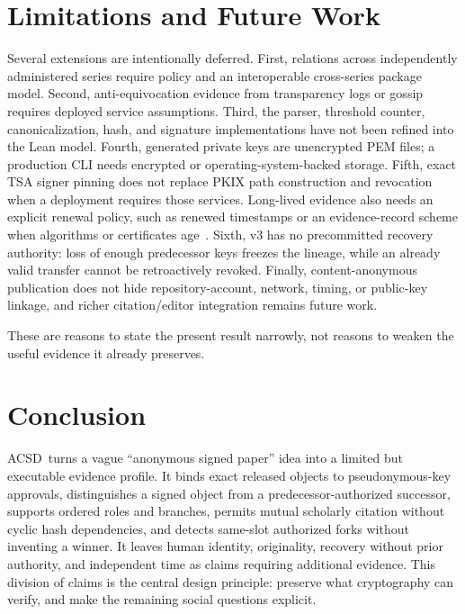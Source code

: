 \documentclass[11pt]{article}
\newcommand{\acsd}{\textsc{ACSD}}
\begin{document}
\section{Limitations and Future Work}

Several extensions are intentionally deferred. First, relations across independently administered series require policy and an interoperable cross-series package model. Second, anti-equivocation evidence from transparency logs or gossip requires deployed service assumptions. Third, the parser, threshold counter, canonicalization, hash, and signature implementations have not been refined into the Lean model. Fourth, generated private keys are unencrypted PEM files; a production CLI needs encrypted or operating-system-backed storage. Fifth, exact TSA signer pinning does not replace PKIX path construction and revocation when a deployment requires those services. Long-lived evidence also needs an explicit renewal policy, such as renewed timestamps or an evidence-record scheme when algorithms or certificates age~\cite{ers}. Sixth, v3 has no precommitted recovery authority: loss of enough predecessor keys freezes the lineage, while an already valid transfer cannot be retroactively revoked. Finally, content-anonymous publication does not hide repository-account, network, timing, or public-key linkage, and richer citation/editor integration remains future work.

These are reasons to state the present result narrowly, not reasons to weaken the useful evidence it already preserves.

\section{Conclusion}

\acsd\ turns a vague ``anonymous signed paper'' idea into a limited but executable evidence profile. It binds exact released objects to pseudonymous-key approvals, distinguishes a signed object from a predecessor-authorized successor, supports ordered roles and branches, permits mutual scholarly citation without cyclic hash dependencies, and detects same-slot authorized forks without inventing a winner. It leaves human identity, originality, recovery without prior authority, and independent time as claims requiring additional evidence. This division of claims is the central design principle: preserve what cryptography can verify, and make the remaining social questions explicit.
\end{document}

